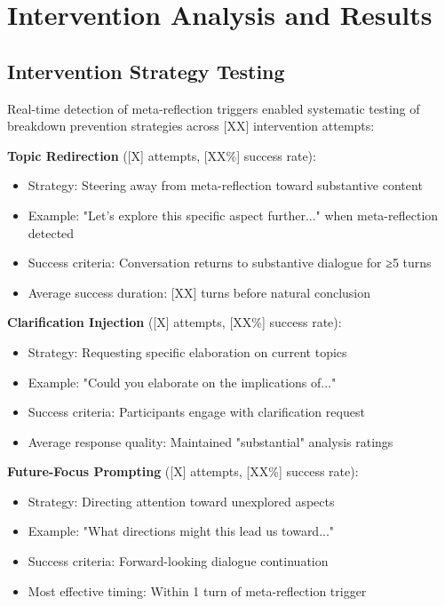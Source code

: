 \documentclass[11pt,letterpaper]{article}
\begin{document}
\section{Intervention Analysis and Results}
\label{app:intervention}

\subsection{Intervention Strategy Testing}

Real-time detection of meta-reflection triggers enabled systematic testing of breakdown prevention strategies across [XX] intervention attempts:

\textbf{Topic Redirection} ([X] attempts, [XX\%] success rate):
\begin{itemize}
    \item Strategy: Steering away from meta-reflection toward substantive content
    \item Example: "Let's explore this specific aspect further..." when meta-reflection detected
    \item Success criteria: Conversation returns to substantive dialogue for ≥5 turns
    \item Average success duration: [XX] turns before natural conclusion
\end{itemize}

\textbf{Clarification Injection} ([X] attempts, [XX\%] success rate):
\begin{itemize}
    \item Strategy: Requesting specific elaboration on current topics
    \item Example: "Could you elaborate on the implications of..." 
    \item Success criteria: Participants engage with clarification request
    \item Average response quality: Maintained "substantial" analysis ratings
\end{itemize}

\textbf{Future-Focus Prompting} ([X] attempts, [XX\%] success rate):
\begin{itemize}
    \item Strategy: Directing attention toward unexplored aspects
    \item Example: "What directions might this lead us toward..."
    \item Success criteria: Forward-looking dialogue continuation
    \item Most effective timing: Within 1 turn of meta-reflection trigger
\end{itemize}
\end{document}
